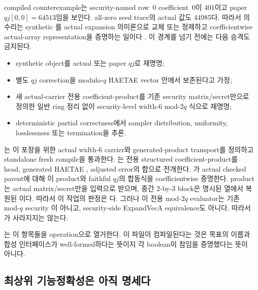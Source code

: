 compiled counterexample는 security-named row~0 coefficient~0이 401이고 paper
\(qj[0,0]=64513\)임을 보인다. all-zero seed trace의 actual 값도 44985다.
따라서 \CurrentGate 의 수리는 synthetic
를 actual expansion 의미론으로 교체 또는
정제하고 coefficientwise actual-array representation을 증명하는 일이다
\cite{post-freeze-kg-actual-avec-qj-report}. 이 경계를 넘기 전에는 다음 승격도
금지된다.

\begin{itemize}
  \item synthetic object를 actual  또는 paper \(qj\)로 재명명;
  \item 별도 \(qj\) correction을 modulo-\(q\) HAETAE vector 안에서 보존된다고 가정;
  \item 새 actual-carrier 전용 coefficient-product를 기존 security
        matrix/secret만으로 정의한 일반 ring  정리 없이
        security-level width-6 mod-\(2q\) 식으로 재명명;
  \item deterministic partial correctness에서 sampler distribution, uniformity,
        losslessness 또는 termination을 추론.
\end{itemize}

는 이 포장을 위한 actual width-6 carrier와
generated-product transport를 정의하고 standalone fresh compile을 통과한다.
는 전용 structured
coefficient-product를 head, generated HAETAE , adjusted
error의 합으로 전개한다.
가
actual checked parent에 대해 이 product와 faithful \(qj\)의 합동식을
coefficientwise 증명한다. product는 actual matrix/secret만을 입력으로 받으며,
중간 2-by-3 block은 명시된 열에서 복원된 이다.
따라서 이 작업의 판정은 \FaithfulAugmentedVerdict 다. 그러나 이 전용
mod-\(2q\) evaluator는 기존 mod-\(q\) security 이 아니고,
security-side ExpandVecA equivalence도 아니다. 따라서 \CurrentGate 가 사라지지는
않는다.

는 이 항목들을
 operation으로 열거한다. 이 파일이 컴파일된다는 것은
목표의 이름과 합성 인터페이스가 well-formed하다는 뜻이지 각 boolean이
참임을 증명했다는 뜻이 아니다.

\subsection{최상위 기능정확성은 아직 명세다}

